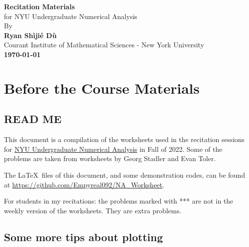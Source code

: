 \documentclass[11pt,letterpaper]{report}
\begin{document}
\begin{titlepage}
    \begin{center}
        \vspace*{4cm}
        \Huge
        \textbf{Recitation Materials} \\
        \vspace{0.5cm}
        \LARGE
        {for NYU Undergraduate Numerical Analysis}\\
        \vspace{3cm}
        By\\
        \vspace{0.5cm}
        \textbf{Ryan Sh\`iji\'e D\`u}\\
        \vspace{0.2cm}
        \normalsize
        {Courant Institute of Mathematical Sciences - New York University}\\
        \vspace{2cm}
        \Large
        \textbf{\today}
        
    \end{center}
\end{titlepage}

\setcounter{tocdepth}{1}
\tableofcontents

\setcounter{chapter}{-1}
\chapter{Before the Course Materials}
\section{READ ME}
This document is a compilation of the worksheets used in the recitation sessions for \href{https://math.nyu.edu/dynamic/courses/undergrad/math-ua-252/}{NYU Undergraduate Numerical Analysis} in Fall of 2022. Some of the problems are taken from worksheets by Georg Stadler and Evan Toler.

The \LaTeX\ files of this document, and some demonstration codes, can be found at \url{https://github.com/Empyreal092/NA_Worksheet}.

For students in my recitations: the problems marked with *** are not in the weekly version of the worksheets. They are extra problems.

\section{Some more tips about plotting}
\end{document}
